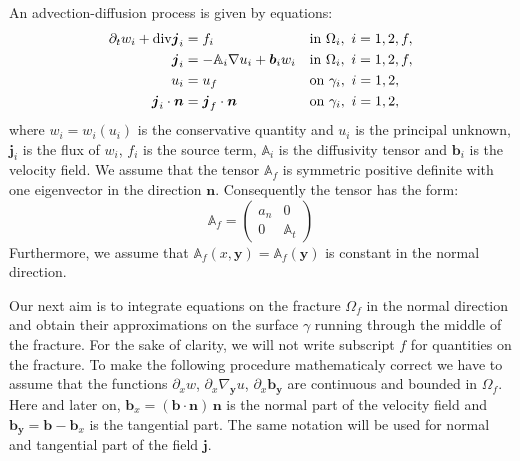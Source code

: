 \documentclass[a4paper]{article}
\def\prtl{\partial}
\def\vc#1{\mathbf{\boldsymbol{#1}}}     %
\def\tn#1{{\mathbb{#1}}}    %
\def\div{{\rm div}}
\def\grad{\nabla}
\begin{document}
An advection-diffusion process is given by equations:
\begin{align}
  \label{eq:fr:continuity}
  \prtl_t w_i + \div \vc j_i &= f_i&&  \text{in } \Omega_i,\ i=1,2,f,\\
  \label{eq:fr:flux}
  \vc j_i &= - \tn A_i\grad u_i + \vc b_i w_i&& \text{in } \Omega_i,\ i=1,2,f,\\
  \label{eq:fr:Dirichlet}
  u_i &= u_f&& \text{on } \gamma_i,\ i=1,2,\\
  \label{eq:fr:Neumann}
  \vc j_i \cdot \vc n &= \vc j_f \cdot \vc n&& \text{on } \gamma_i,\ i=1,2,
\end{align}
where $w_i=w_i(u_i)$ is the conservative quantity and $u_i$ is the principal unknown, $\vc j_i$ is the flux of $w_i$, $f_i$ is the source term,
$\tn A_i$ is the diffusivity tensor and $\vc b_i$ is the velocity field. We assume that the tensor $\tn A_f$ is symmetric positive definite 
with one eigenvector in the direction $\vc n$. Consequently the tensor has the form:
\[
 \tn A_f = \begin{pmatrix} 
            a_n & 0  \\
            0 & \tn A_t
       \end{pmatrix}
\]
Furthermore, we assume that $\tn A_f(x, \vc y)=\tn A_f(\vc y)$ is constant in the normal direction.

Our next aim is to integrate equations on the fracture $\Omega_f$ in the normal direction 
and obtain their approximations on the surface $\gamma$ running through the middle of the fracture. 
For the sake of clarity, we will not write subscript $f$ for quantities on the fracture. 
To make the following procedure mathematicaly correct we have to assume that the functions
$\prtl_x w$, $\prtl_x \grad_{\vc y} u$, $\prtl_x \vc b_{\vc y}$ are continuous and bounded in $\Omega_f$. Here and later on, 
$\vc b_x=(\vc b \cdot \vc n)\, \vc n$ is the normal part of the velocity field and $\vc b_{\vc y} = \vc b - \vc b_x$ is the tangential part.
The same notation will be used for normal and tangential part of the field $\vc j$.
\end{document}
